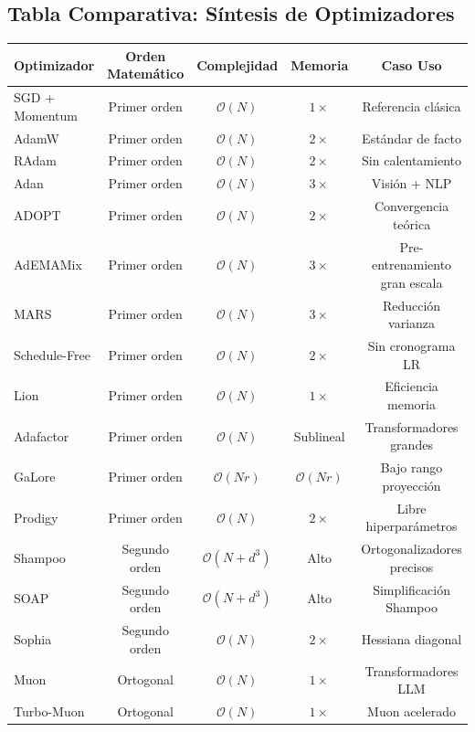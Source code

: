 \documentclass[11pt,a4paper]{article}
\begin{document}
\subsection{Tabla Comparativa: Síntesis de Optimizadores}

\begin{table}[h]
\centering
\small
\begin{tabular}{|l|c|c|c|c|}
\hline
\textbf{Optimizador} & \textbf{Orden Matemático} & \textbf{Complejidad} & \textbf{Memoria} & \textbf{Caso Uso} \\
\hline
SGD + Momentum & Primer orden & $\mathcal{O}(N)$ & $1 \times$ & Referencia clásica \\
\hline
AdamW & Primer orden & $\mathcal{O}(N)$ & $2 \times$ & Estándar de facto \\
\hline
RAdam & Primer orden & $\mathcal{O}(N)$ & $2 \times$ & Sin calentamiento \\
\hline
Adan & Primer orden & $\mathcal{O}(N)$ & $3 \times$ & Visión + NLP \\
\hline
ADOPT & Primer orden & $\mathcal{O}(N)$ & $2 \times$ & Convergencia teórica \\
\hline
AdEMAMix & Primer orden & $\mathcal{O}(N)$ & $3 \times$ & Pre-entrenamiento gran escala \\
\hline
MARS & Primer orden & $\mathcal{O}(N)$ & $3 \times$ & Reducción varianza \\
\hline
Schedule-Free & Primer orden & $\mathcal{O}(N)$ & $2 \times$ & Sin cronograma LR \\
\hline
Lion & Primer orden & $\mathcal{O}(N)$ & $1 \times$ & Eficiencia memoria \\
\hline
Adafactor & Primer orden & $\mathcal{O}(N)$ & Sublineal & Transformadores grandes \\
\hline
GaLore & Primer orden & $\mathcal{O}(Nr)$ & $\mathcal{O}(Nr)$ & Bajo rango proyección \\
\hline
Prodigy & Primer orden & $\mathcal{O}(N)$ & $2 \times$ & Libre hiperparámetros \\
\hline
Shampoo & Segundo orden & $\mathcal{O}(N+d^3)$ & Alto & Ortogonalizadores precisos \\
\hline
SOAP & Segundo orden & $\mathcal{O}(N+d^3)$ & Alto & Simplificación Shampoo \\
\hline
Sophia & Segundo orden & $\mathcal{O}(N)$ & $2 \times$ & Hessiana diagonal \\
\hline
Muon & Ortogonal & $\mathcal{O}(N)$ & $1 \times$ & Transformadores LLM \\
\hline
Turbo-Muon & Ortogonal & $\mathcal{O}(N)$ & $1 \times$ & Muon acelerado \\
\hline
\end{tabular}
\end{table}
\end{document}

